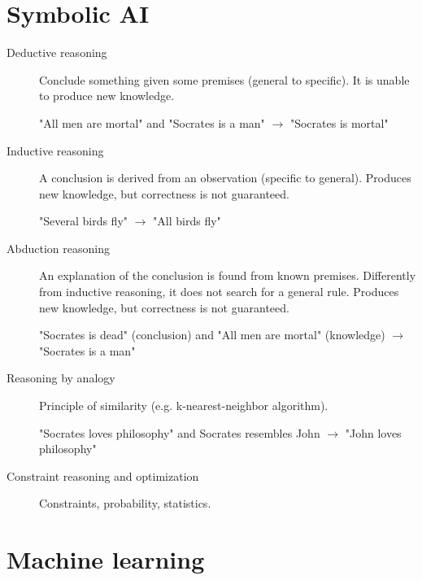 \section{Symbolic AI}
\begin{description}
    \item[Deductive reasoning] 
        Conclude something given some premises (general to specific). 
        It is unable to produce new knowledge.
        \begin{example}
            "All men are mortal" and "Socrates is a man" $\rightarrow$ "Socrates is mortal"
        \end{example}
    
    \item[Inductive reasoning] 
        A conclusion is derived from an observation (specific to general).
        Produces new knowledge, but correctness is not guaranteed.
        \begin{example}
            "Several birds fly" $\rightarrow$ "All birds fly"
        \end{example}

    \item[Abduction reasoning] 
        An explanation of the conclusion is found from known premises.
        Differently from inductive reasoning, it does not search for a general rule.
        Produces new knowledge, but correctness is not guaranteed.
        \begin{example}
            "Socrates is dead" (conclusion) and "All men are mortal" (knowledge) $\rightarrow$ "Socrates is a man"
        \end{example}
    
    \item[Reasoning by analogy] 
        Principle of similarity (e.g. k-nearest-neighbor algorithm).
        \begin{example}
            "Socrates loves philosophy" and Socrates resembles John $\rightarrow$ "John loves philosophy"
        \end{example}

    \item[Constraint reasoning and optimization] 
        Constraints, probability, statistics.
\end{description}



\section{Machine learning}

